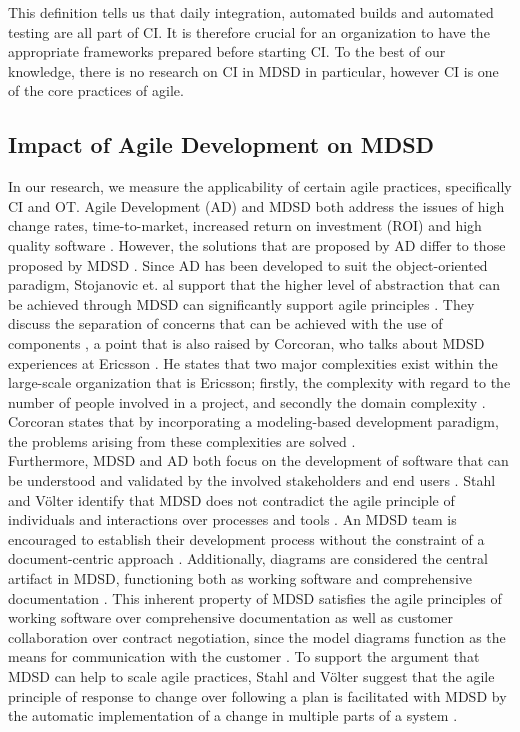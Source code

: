 \documentclass[fina_report_innit.tex]{subfiles}
\begin{document}
This definition tells us that daily integration, automated builds and automated testing are all part of CI. It is therefore crucial for an organization to have the appropriate frameworks prepared before starting CI. To the best of our knowledge, there is no research on CI in MDSD in particular, however CI is one of the core practices of agile.

\subsection{Impact of Agile Development on MDSD}

In our research, we measure the applicability of certain agile practices, specifically CI and OT. Agile Development (AD) and MDSD both address the issues of high change rates, time-to-market, increased return on investment (ROI) and high quality software \cite{stojanovic2003component}. However, the solutions that are proposed by AD differ to those proposed by MDSD \cite{stojanovic2003component}. Since AD has been developed to suit the object-oriented paradigm, Stojanovic et. al support that the higher level of abstraction that can be achieved through MDSD can significantly support agile principles \cite{stojanovic2003component}. They discuss the separation of concerns that can be achieved with the use of components \cite{stojanovic2003component}, a point that is also raised by Corcoran, who talks about MDSD experiences at Ericsson \cite{selic2010modelling}. He states that two major complexities exist within the large-scale organization that is Ericsson; firstly, the complexity with regard to the number of people involved in a project, and secondly the domain complexity \cite{selic2010modelling}. Corcoran states that by incorporating a modeling-based development paradigm, the problems arising from these complexities are solved \cite{selic2010modelling}. 
\\

Furthermore, MDSD and AD both focus on the development of software that can be understood and validated by the involved stakeholders and end users \cite{stahl2006model}. Stahl and Völter identify that MDSD does not contradict the agile principle of individuals and interactions over processes and tools \cite{stahl2006model}. An MDSD team is encouraged to establish their development process without the constraint of a document-centric approach \cite{stahl2006model}. Additionally, diagrams are considered the central artifact in MDSD, functioning both as working software and comprehensive documentation \cite{stahl2006model}. This inherent property of MDSD satisfies the agile principles of working software over comprehensive documentation as well as customer collaboration over contract negotiation, since the model diagrams function as the means for communication with the customer \cite{stahl2006model}. To support the argument that MDSD can help to scale agile practices, Stahl and Völter suggest that the agile principle of response to change over following a plan is facilitated with MDSD by the automatic implementation of a change in multiple parts of a system \cite{stahl2006model}.
\end{document}
